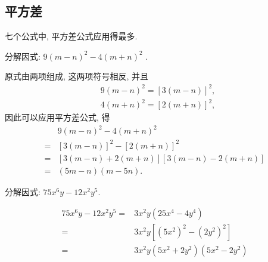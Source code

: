 \subsection{平方差}
七个公式中, 平方差公式应用得最多.
\begin{example}
	分解因式: $9(m-n)^{2}-4(m+n)^{2}$ .
\end{example}
\begin{solution}
	原式由两项组成, 这两项符号相反, 并且
	\begin{align*}
		 & 9(m-n)^{2}=[3(m-n)]^{2}, \\
		 & 4(m+n)^{2}=[2(m+n)]^{2},
	\end{align*}
	因此可以应用平方差公式, 得
	\begin{align*}
		  & 9(m-n)^{2}-4(m+n)^{2}            \\
		= & {[3(m-n)]^{2}-[2(m+n)]^{2}}      \\
		= & {[3(m-n)+2(m+n)][3(m-n)-2(m+n)]} \\
		= & (5 m-n)(m-5 n) .
	\end{align*}
\end{solution}

\begin{example}
	分解因式: $75 x^{6} y-12 x^{2} y^{5}$.
\end{example}
\begin{solution}
	\begin{align*}
		75 x^{6} y - 12 x^{2} y^{5}  = & 3 x^{2} y \left(25 x^{4} - 4 y^{4}\right)                                  \\
		=                              & 3 x^{2} y \left[\left(5 x^{2}\right)^{2} - \left(2 y^{2}\right)^{2}\right] \\
		=                              & 3 x^{2} y \left(5 x^{2} + 2 y^{2}\right) \left(5 x^{2} - 2 y^{2}\right)
	\end{align*}
\end{solution}

